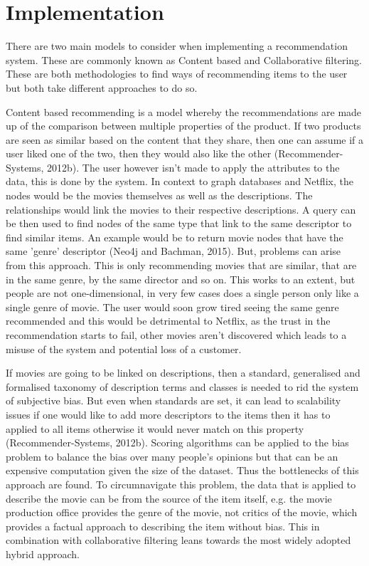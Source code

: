 \documentclass[a4paper]{article}
\begin{document}
\section{Implementation}
\label{sec:Implementation}

There are two main models to consider when implementing a recommendation system. These are commonly known as Content based and Collaborative filtering. These are both methodologies to find ways of recommending items to the user but both take different approaches to do so.

Content based recommending is a model whereby the recommendations are made up of the comparison between multiple properties of the product. If two products are seen as similar based on the content that they share, then one can assume if a user liked one of the two, then they would also like the other (Recommender-Systems, 2012b). The user however isn't made to apply the attributes to the data, this is done by the system. In context to graph databases and Netflix, the nodes would be the movies themselves as well as the descriptions. The relationships would link the movies to their respective descriptions. A query can be then used to find nodes of the same type that link to the same descriptor to find similar items. An example would be to return movie nodes that have the same 'genre' descriptor (Neo4j and Bachman, 2015). But, problems can arise from this approach. This is only recommending movies that are similar, that are in the same genre, by the same director and so on. This works to an extent, but people are not one-dimensional, in very few cases does a single person only like a single genre of movie. The user would soon grow tired seeing the same genre recommended and this would be detrimental to Netflix, as the trust in the recommendation starts to fail, other movies aren't discovered which leads to a misuse of the system and potential loss of a customer.

If movies are going to be linked on descriptions, then a standard, generalised and formalised taxonomy of description terms and classes is needed to rid the system of subjective bias. But even when standards are set, it can lead to scalability issues if one would like to add more descriptors to the items then it has to applied to all items otherwise it would never match on this property (Recommender-Systems, 2012b). Scoring algorithms can be applied to the bias problem to balance the bias over many people's opinions but that can be an expensive computation given the size of the dataset. Thus the bottlenecks of this approach are found. To circumnavigate this problem, the data that is applied to describe the movie can be from the source of the item itself, e.g. the movie production office provides the genre of the movie, not critics of the movie, which provides a factual approach to describing the item without bias. This in combination with collaborative filtering leans towards the most widely adopted hybrid approach.
\end{document}
